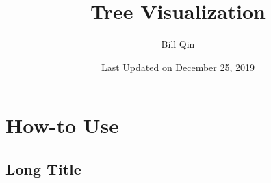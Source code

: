 \documentclass[openany]{book}
\title{Tree Visualization}
\author{Bill Qin}
\date{Last Updated on December 25, 2019}
\begin{document}
\maketitle

\tableofcontents

\chapter{How-to Use}

\section{Long Title}
\end{document}
